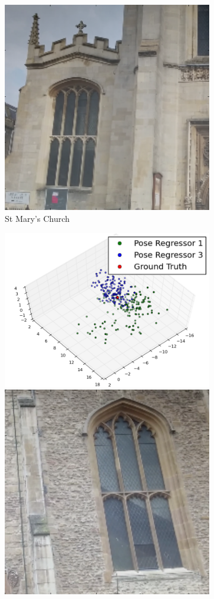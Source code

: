 \begin{figure}[t]
\begin{center}
\begin{subfigure}{0.25\linewidth}
\begin{center}
        \includegraphics[width=0.5\linewidth]{Uncertainty/pose_samples_stmarys1_img}
		\end{center}
        \caption{St Mary's Church}
    \end{subfigure}
	\begin{subfigure}{0.25\linewidth}
		\begin{center}
        \includegraphics[width=\linewidth]{Uncertainty/pose_samples_stmarys2}
        \includegraphics[width=0.5\linewidth]{Uncertainty/pose_samples_stmarys2_img}

\end{center}
\end{subfigure}
\end{center}
\end{figure}
